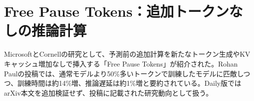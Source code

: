 \section{Free Pause Tokens：追加トークンなしの推論計算}
MicrosoftとCornellの研究として、予測前の追加計算を新たなトークン生成やKVキャッシュ増加なしで挿入する「Free Pause Tokens」が紹介された。Rohan Paulの投稿では、通常モデルより50\%多いトークンで訓練したモデルに匹敵しつつ、訓練時間は約14\%増、推論遅延は約1\%増と要約されている。Daily版ではarXiv本文を追加検証せず、投稿に記載された研究動向として扱う。
